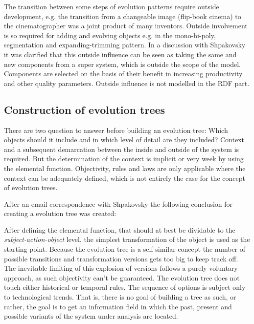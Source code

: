 \documentclass[11pt,a4paper]{article}
\begin{document}
The transition between some steps of evolution patterns require outside development, e.g. the transition from a changeable image (flip-book cinema) to the cinematographer was a joint product of many inventors. Outside involvement is so required for adding and evolving objects e.g. in the mono-bi-poly, segmentation and expanding-trimming pattern.
In a discussion with Shpakovsky it was clarified that this outside influence can be seen as taking the same and new components from a super system, which is outside the scope of the model. Components are selected on the basis of their benefit in increasing productivity and other quality parameters. Outside influence is not modelled in the RDF part. 

\subsection{Construction of evolution trees}

There are two question to answer before building an evolution tree: Which objects should it include and in which level of detail are they included? Context and a subsequent demarcation between the inside and outside of the system is required. But the determination of the context is implicit or very week by using the elemental function. Objectivity, rules and laws are only applicable where the context can be adequately defined, which is not entirely the case for the concept of evolution trees. 

After an email correspondence with Shpakovsky the following conclusion for creating a evolution tree was created:

After defining the elemental function, that should at best be dividable to the \textit{subject-action-object} level, the simplest transformation of the object is used as the starting point. Because the evolution tree is a self similar concept the number of possible transitions and transformation versions gets too big to keep track off. The inevitable limiting of this explosion of versions follows a purely voluntary approach, as such objectivity can't be guaranteed. The evolution tree does not touch either historical or temporal rules. The sequence of options is subject only to technological trends. That is, there is no goal of building a tree as such, or rather, the goal is to get an information field in which the past, present and possible variants of the system under analysis are located.
\end{document}
